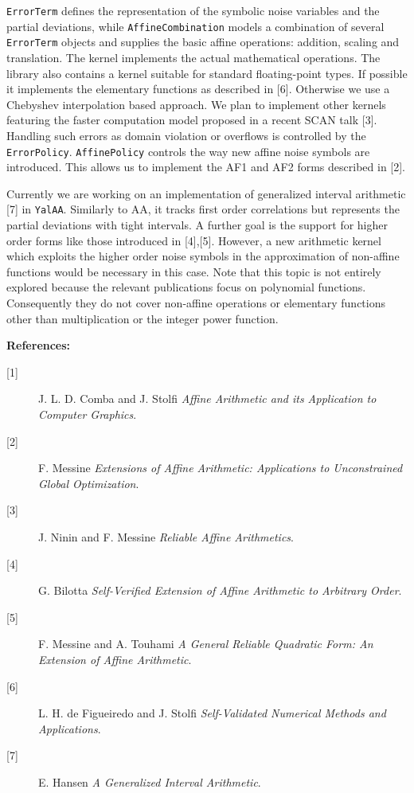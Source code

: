 \documentclass[a4, fontsize=10pt]{scrartcl}
\newcommand{\yalaa}{\texttt{YalAA}\xspace}
\begin{document}
\texttt{ErrorTerm} defines the representation of the symbolic noise variables
and the partial deviations, while \texttt{AffineCombination} models a
combination of several \texttt{ErrorTerm} objects and supplies the basic
affine operations: addition, scaling and translation.  The kernel implements
the actual mathematical operations. The library also contains a kernel
suitable for standard floating-point types. If possible it implements the
elementary functions as described in [6]. Otherwise we use a Chebyshev
interpolation based approach. We plan to implement other kernels featuring the
faster computation model proposed in a recent SCAN talk [3]. Handling such errors
as domain violation or overflows is controlled by the
\texttt{ErrorPolicy}. \texttt{AffinePolicy} controls the way new affine noise
symbols are introduced. This allows us to implement the AF1 and AF2 forms
described in [2].

Currently we are working on an implementation of generalized interval
arithmetic [7] in \yalaa.  Similarly to AA, it tracks first order
correlations but represents the partial deviations with tight intervals. A
further goal is the support for higher order forms like those introduced in
[4],[5]. However, a new arithmetic kernel which exploits the higher order
noise symbols in the approximation of non-affine functions would be necessary
in this case. Note that this topic is not entirely explored because the relevant
publications focus on polynomial functions. Consequently they do not
cover non-affine operations or elementary
functions other than multiplication or the integer power function.\\

\small{
{\bf References:}
\begin{description}
\item[{[1]}] J. L. D. Comba and J. Stolfi \textit{Affine Arithmetic and its Application to
  Computer Graphics}.
\item[{[2]}] F. Messine \textit{Extensions of Affine Arithmetic:
    Applications to Unconstrained Global Optimization}.
\item[{[3]}] J. Ninin and F. Messine \textit{Reliable Affine Arithmetics}.
\item[{[4]}] G. Bilotta \textit{Self-Verified Extension of Affine Arithmetic
    to Arbitrary Order}. 
\item[{[5]}] F. Messine and A. Touhami \textit{A General Reliable Quadratic Form: An Extension of Affine Arithmetic}.
\item[{[6]}] L. H. de Figueiredo and J. Stolfi \textit{Self-Validated Numerical Methods and Applications}.
\item[{[7]}] E. Hansen \textit{A Generalized Interval Arithmetic}.
\end{description}
}
\end{document}
